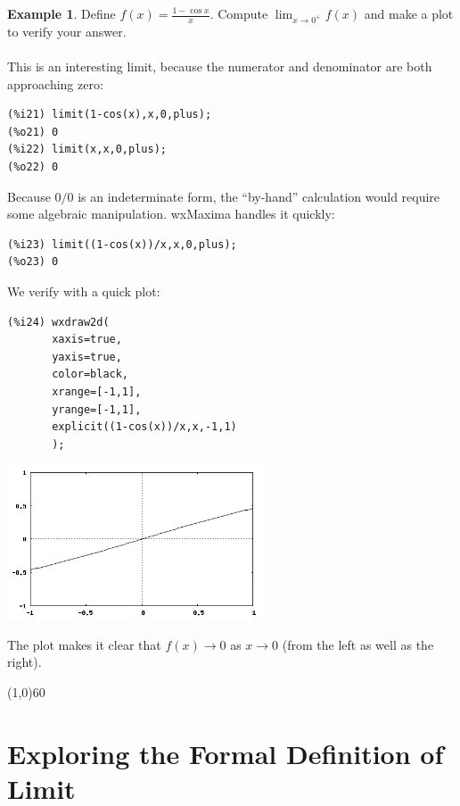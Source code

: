 \documentclass[10.5pt,twoside]{report}
\theoremstyle{definition}
\newtheorem{exmp}{Example}[section]
\begin{document}
\begin{exmp} Define $f(x)=\frac{1-\cos{x}}{x}$.  Compute $\lim_{x \to 0^+}f(x)$ and make a plot to verify your answer.\\
${}$\\

This is an interesting limit, because the numerator and denominator are both approaching zero:

\begin{verbatim}
(%i21) limit(1-cos(x),x,0,plus);
(%o21) 0
(%i22) limit(x,x,0,plus);
(%o22) 0
\end{verbatim}

Because $0/0$ is an indeterminate form, the ``by-hand'' calculation would require some algebraic manipulation.  wxMaxima handles it quickly:

\begin{verbatim}
(%i23) limit((1-cos(x))/x,x,0,plus);
(%o23) 0
\end{verbatim}

We verify with a quick plot:

\begin{verbatim}
(%i24) wxdraw2d(
       xaxis=true,
       yaxis=true,
       color=black,
       xrange=[-1,1],
       yrange=[-1,1],
       explicit((1-cos(x))/x,x,-1,1)
       );
\end{verbatim}

\includegraphics[width=3in]{example_3_2_4}

The plot makes it clear that $f(x) \to 0$ as $x \to 0$ (from the left as well as the right).

\end{exmp}

\line(1,0){60}
\linethickness{0.5mm}

\pagebreak


\section{Exploring the Formal Definition of Limit}\label{Exploring the Formal Definition of Limit}
\end{document}
